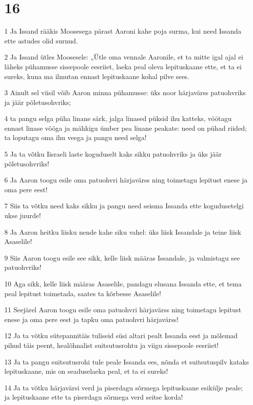 \chapter{16}

\par 1 Ja Issand rääkis Moosesega pärast Aaroni kahe poja surma, kui need Issanda ette astudes olid surnud.
\par 2 Ja Issand ütles Moosesele: „Ütle oma vennale Aaronile, et ta mitte igal ajal ei läheks pühamusse sissepoole eesriiet, laeka peal oleva lepituskaane ette, et ta ei sureks, kuna ma ilmutan ennast lepituskaane kohal pilve sees.
\par 3 Ainult sel viisil võib Aaron minna pühamusse: üks noor härjavärss patuohvriks ja jäär põletusohvriks;
\par 4 ta pangu selga püha linane särk, jalga linased püksid ihu katteks, vöötagu ennast linase vööga ja mähkigu ümber pea linane peakate: need on pühad riided; ta loputagu oma ihu veega ja pangu need selga!
\par 5 Ja ta võtku Iisraeli laste koguduselt kaks sikku patuohvriks ja üks jäär põletusohvriks!
\par 6 Ja Aaron toogu esile oma patuohvri härjavärss ning toimetagu lepitust enese ja oma pere eest!
\par 7 Siis ta võtku need kaks sikku ja pangu need seisma Issanda ette kogudusetelgi ukse juurde!
\par 8 Ja Aaron heitku liisku nende kahe siku vahel: üks liisk Issandale ja teine liisk Asaselile!
\par 9 Siis Aaron toogu esile see sikk, kelle liisk määras Issandale, ja valmistagu see patuohvriks!
\par 10 Aga sikk, kelle liisk määras Asaselile, pandagu elusana Issanda ette, et tema peal lepitust toimetada, saates ta kõrbesse Asaselile!
\par 11 Seejärel Aaron toogu esile oma patuohvri härjavärss ning toimetagu lepitust enese ja oma pere eest ja tapku oma patuohvri härjavärss!
\par 12 Ja ta võtku sütepannitäis tuliseid süsi altari pealt Issanda eest ja mõlemad pihud täis peent, healõhnalist suitsutusrohtu ja viigu sissepoole eesriiet!
\par 13 Ja ta pangu suitsutusrohi tule peale Issanda ees, nõnda et suitsutuspilv kataks lepituskaane, mis on seaduselaeka peal, et ta ei sureks!
\par 14 Ja ta võtku härjavärsi verd ja piserdagu sõrmega lepituskaane esikülje peale; ja lepituskaane ette ta piserdagu sõrmega verd seitse korda!
